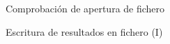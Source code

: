 \documentclass[8pt]{extarticle}
\newcommand{\cmdo}[1]{\texttt{\small\bfseries#1}} %
\newcommand{\hseparador}{\chline{gray!50!Header}}
\newcommand{\hlinefinal}{\chline{Header}\chline{Header}}
\begin{document}
\begin{multicols}{3}
%

        \begin{exampleBlock}{Comprobaci\'on de apertura de fichero}
        \end{exampleBlock}

        \begin{exampleBlock}{Escritura de resultados en fichero (I)}
        \end{exampleBlock}
        

\end{multicols}
\end{document}

